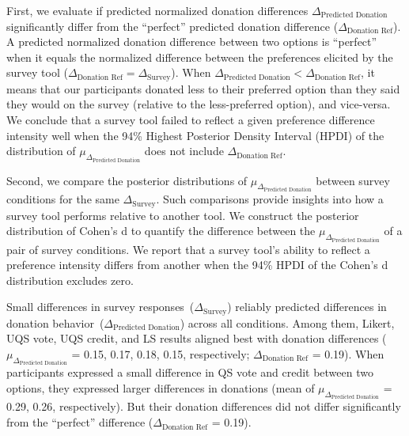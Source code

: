 First, we evaluate if predicted normalized donation differences $\Delta_{\text{Predicted Donation}}$ significantly differ from the ``perfect'' predicted donation difference ($\Delta_{\text{Donation Ref}}$). A predicted normalized donation difference between two options is ``perfect'' when it equals the normalized difference between the preferences elicited by the survey tool ($\Delta_{\text{Donation Ref}} = \Delta_{\text{Survey}}$). When $\Delta_{\text{Predicted Donation}} < \Delta_{\text{Donation Ref}}$, it means that our participants donated less to their preferred option than they said they would on the survey (relative to the less-preferred option), and vice-versa. We conclude that a survey tool failed to reflect a given preference difference intensity well when the 94\% Highest Posterior Density Interval (HPDI) of the distribution of $\mu_{\Delta_{\text{Predicted Donation}}}$ does not include $\Delta_{\text{Donation Ref}}$. 

Second, we compare the posterior distributions of $\mu_{\Delta_{\text{Predicted Donation}}}$ between survey conditions for the same $\Delta_{\text{Survey}}$. Such comparisons provide insights into how a survey tool performs relative to another tool. We construct the posterior distribution of Cohen's d to quantify the difference between the $\mu_{\Delta_{\text{Predicted Donation}}}$ of a pair of survey conditions. We report that a survey tool's ability to reflect a preference intensity differs from another when the 94\% HPDI of the Cohen's d distribution excludes zero. 

Small differences in survey responses~($\Delta_{\text{Survey}}$) reliably predicted differences in donation behavior~($\Delta_{\text{Predicted Donation}}$) across all conditions. Among them, Likert, UQS vote, UQS credit, and LS results aligned best with donation differences ($\mu_{\Delta_{\text{Predicted Donation}}}$ = 0.15, 0.17, 0.18, 0.15, respectively; $\Delta_{\text{Donation Ref}}$ = 0.19). When participants expressed a small difference in QS vote and credit between two options, they expressed larger differences in donations (mean of $\mu_{\Delta_{\text{Predicted Donation}}}$ = 0.29, 0.26, respectively). But their donation differences did not differ significantly from the ``perfect'' difference ($\Delta_{\text{Donation Ref}}$ = 0.19).


